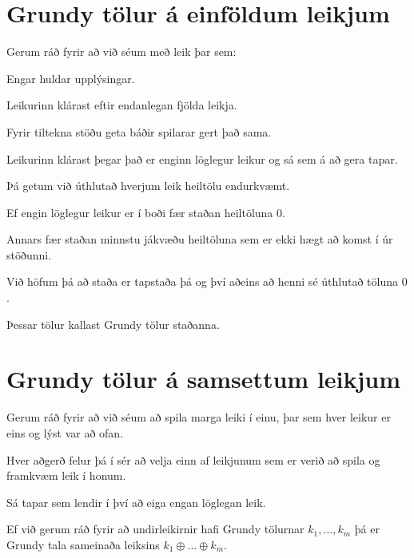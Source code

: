 \section{Grundy tölur á einföldum leikjum}
{
    {
        \item<1-> Gerum ráð fyrir að við séum með leik þar sem:
        {
            \item<1-> Engar huldar upplýsingar.
            \item<1-> Leikurinn klárast eftir endanlegan fjölda leikja.
            \item<1-> Fyrir tiltekna stöðu geta báðir spilarar gert það sama.
            \item<1-> Leikurinn klárast þegar það er enginn löglegur leikur og sá sem á að gera tapar.
        }
        \item<2-> Þá getum við úthlutað hverjum leik heiltölu endurkvæmt.
        \item<3-> Ef engin löglegur leikur er í boði fær staðan heiltöluna $0$.
        \item<4-> Annars fær staðan minnstu jákvæðu heiltöluna sem er ekki hægt að komst í úr stöðunni.
        \item<5-> Við höfum þá að staða er tapstaða þá og því aðeins að henni sé úthlutað töluna $0$.
        \item<6-> Þessar tölur kallast Grundy tölur staðanna.
    }
}

\section{Grundy tölur á samsettum leikjum}
{
    {
        \item<1-> Gerum ráð fyrir að við séum að spila marga leiki í einu, þar sem hver leikur er eins og lýst var að ofan.
        \item<2-> Hver aðgerð felur þá í sér að velja einn af leikjunum sem er verið að spila og framkvæm leik í honum.
        \item<3-> Sá tapar sem lendir í því að eiga engan löglegan leik.
        \item<4-> Ef við gerum ráð fyrir að undirleikirnir hafi Grundy tölurnar $k_1, \dots, k_m$ þá er Grundy tala sameinaða leiksins
                    $k_1 \oplus \dots \oplus k_m$.
    }
}


